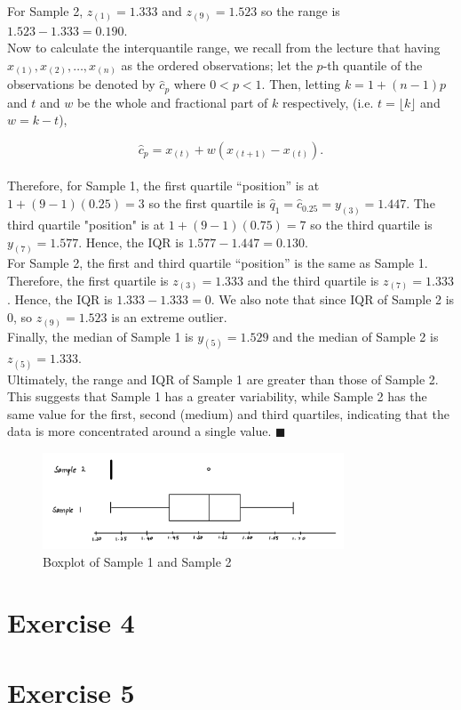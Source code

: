 \documentclass{article}
\begin{document}
For Sample 2, $z_{(1)} = 1.333$ and $z_{(9)} = 1.523$ so the range is $1.523 - 1.333 = 0.190$.  \\

Now to calculate the interquantile range, we recall from the lecture that having $x_{(1)}, x_{(2)}, \dots, x_{(n)}$ as the ordered observations; let the $p$-th quantile of the observations be denoted by $\hat{c}_p$ where $0 < p < 1$. Then, letting $k = 1 + (n-1)p$ and $t$ and $w$ be the whole and fractional part of $k$ respectively, (i.e. $t = \lfloor k \rfloor$ and $w = k - t$),

$$
\hat{c}_p = x_{(t)} + w(x_{(t+1)} - x_{(t)}).
$$
\\
Therefore, for Sample 1, the first quartile ``position'' is at $1 + (9-1)(0.25) = 3$ so the first quartile is $\hat{q}_1 = \hat{c}_{0.25} = y_{(3)} = 1.447$. The third quartile "position" is at $1 + (9-1)(0.75) = 7$ so the third quartile is $y_{(7)} = 1.577$. Hence, the IQR is $1.577 - 1.447 = 0.130$. \\

For Sample 2, the first and third quartile ``position'' is the same as Sample 1. Therefore, the first quartile is $z_{(3)} = 1.333$ and the third quartile is $z_{(7)} = 1.333$. Hence, the IQR is $1.333 - 1.333 = 0$. We also note that since IQR of Sample 2 is 0, so $z_{(9)} = 1.523$ is an extreme outlier. \\

Finally, the median of Sample 1 is $y_{(5)} = 1.529$ and the median of Sample 2 is $z_{(5)} = 1.333$. \\



Ultimately, the range and IQR of Sample 1 are greater than those of Sample 2. This suggests that Sample 1 has a greater variability, while Sample 2 has the same value for the first, second (medium) and third quartiles, indicating that the data is more concentrated around a single value. $\blacksquare$

\begin{figure}[h!]
    \centering
    \includegraphics[width=0.8\textwidth]{images/boxplot.jpg}
    \caption{Boxplot of Sample 1 and Sample 2}
    \label{fig:boxplot}
\end{figure}

\newpage
\section*{Exercise 4}

\newpage
\section*{Exercise 5}
\end{document}
